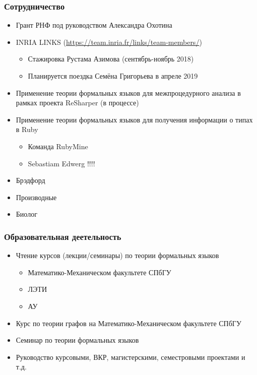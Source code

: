 \documentclass[xcolor=table]{beamer}
\begin{document}
\begin{frame}[fragile]
  \transwipe[direction=90]
  \frametitle{Сотрудничество}
\begin{itemize}
      \item Грант РНФ под руководством Александра Охотина
      \item INRIA LINKS (\url{https://team.inria.fr/links/team-members/})
      \begin{itemize}
         \item Стажировка Рустама Азимова (сентябрь-ноябрь 2018)
         \item Планируется поездка Семёна Григорьева в апреле 2019
      \end{itemize}
      \item Применение теории формальных языков для межпроцедурного анализа в рамках проекта ReSharper (в процессе)
      \item Применение теории формальных языков для получения информации о типах в Ruby
      \begin{itemize}
         \item Команда RubyMine
         \item Sebastiam Edwerg !!!!
      \end{itemize}
      \item Брэдфорд
      \item Производные
      \item Биолог
      
\end{itemize}
\end{frame}

\begin{frame}[fragile]
  \transwipe[direction=90]
  \frametitle{Образовательная деетельность}
\begin{itemize}
      \item Чтение курсов (лекции/семинары) по теории формальных языков 
      \begin{itemize}
         \item Математико-Механическом факультете СПбГУ
         \item ЛЭТИ
         \item АУ
      \end{itemize}
      \item Курс по теории графов на Математико-Механическом факультете СПбГУ
      \item Семинар по теории формальных языков
      \item Руководство курсовыми, ВКР, магистерскими, семестровыми проектами и т.д.
\end{itemize}
\end{frame}
\end{document}

